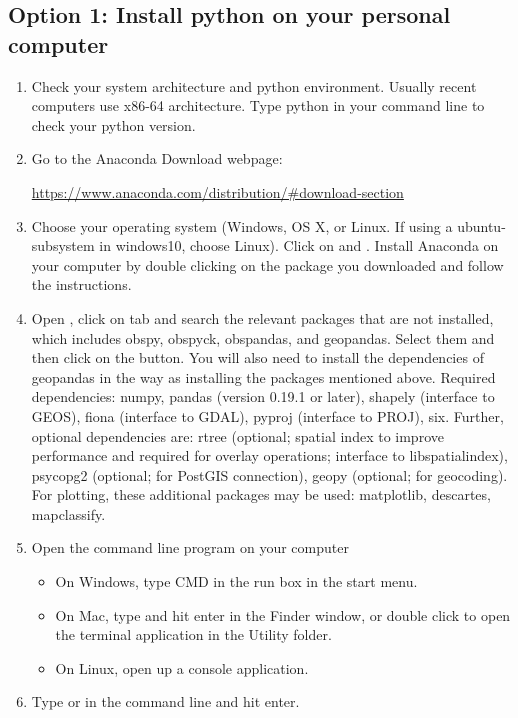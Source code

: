 \documentclass[12pt]{article}   	%
\begin{document}
\subsection*{Option 1: Install python on your personal computer}
\begin{enumerate}[noitemsep]
\item Check your system architecture and python environment. Usually recent computers use x86-64 architecture. Type python in your command line to check your python version.
\item Go to the Anaconda Download webpage:
\begin{center}
\href{https://www.anaconda.com/distribution/\#download-section}{https://www.anaconda.com/distribution/\#download-section}
\end{center}
\item Choose your operating system (Windows, OS X, or Linux. If using a ubuntu-subsystem in windows10, choose Linux). Click on  and .
Install Anaconda on your computer by double clicking on the package you downloaded and follow the instructions.
\item Open ,  click on  tab and search the relevant packages that are not installed, which includes
obspy, obspyck, obspandas, and geopandas. Select them and then click on the  button. You will also need to install the dependencies of 
geopandas in the way as installing the packages mentioned above. Required dependencies: numpy, pandas (version 0.19.1 or later), shapely (interface to GEOS),
fiona (interface to GDAL), pyproj (interface to PROJ), six. Further, optional dependencies are: rtree 
(optional; spatial index to improve performance and required for overlay operations; interface to libspatialindex), psycopg2 (optional; for PostGIS connection),
geopy (optional; for geocoding). For plotting, these additional packages may be used: matplotlib, descartes, mapclassify.

\item Open the command line program on your computer
\begin{itemize}[noitemsep]
\item On Windows, type CMD in the run box in the start menu.
\item On Mac, type  and hit enter in the Finder window, or double click to open the terminal application in the Utility folder.
\item On Linux, open up a console application.
\end{itemize}
\item Type  or  in the command line and hit enter.
\end{enumerate}
\end{document}

